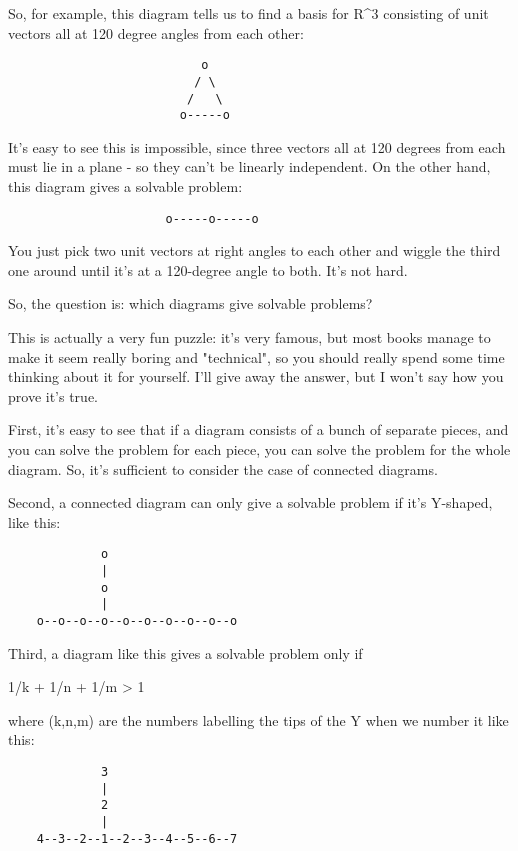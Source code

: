 So, for example, this diagram tells us to find a basis for R^{3}
consisting of unit vectors all at 120 degree angles from each other:

\begin{verbatim}
                           o
                          / \
                         /   \
                        o-----o
\end{verbatim}
    
It's easy to see this is impossible, since three vectors all 
at 120 degrees from each must lie in a plane - so they can't be
linearly independent.  On the other hand, this diagram gives a
solvable problem:

\begin{verbatim}
                      o-----o-----o
\end{verbatim}
    
You just pick two unit vectors at right angles to each other and 
wiggle the third one around until it's at a 120-degree angle to both.
It's not hard.  

So, the question is: which diagrams give solvable problems?

This is actually a very fun puzzle: it's very famous, but most books
manage to make it seem really boring and "technical", so you should
really spend some time thinking about it for yourself.  I'll give away
the answer, but I won't say how you prove it's true.  

First, it's easy to see that if a diagram consists of a bunch of separate
pieces, and you can solve the problem for each piece, you can solve
the problem for the whole diagram.  So, it's sufficient to consider
the case of connected diagrams.  

Second, a connected diagram can only give a solvable problem if it's
Y-shaped, like this:

\begin{verbatim}
             o
             |
             o
             |
    o--o--o--o--o--o--o--o--o--o
\end{verbatim}
    
Third, a diagram like this gives a solvable problem only if

1/k + 1/n + 1/m > 1

where (k,n,m) are the numbers labelling the tips of the Y when we
number it like this:

\begin{verbatim}
             3
             |
             2
             |
    4--3--2--1--2--3--4--5--6--7
\end{verbatim}
    
